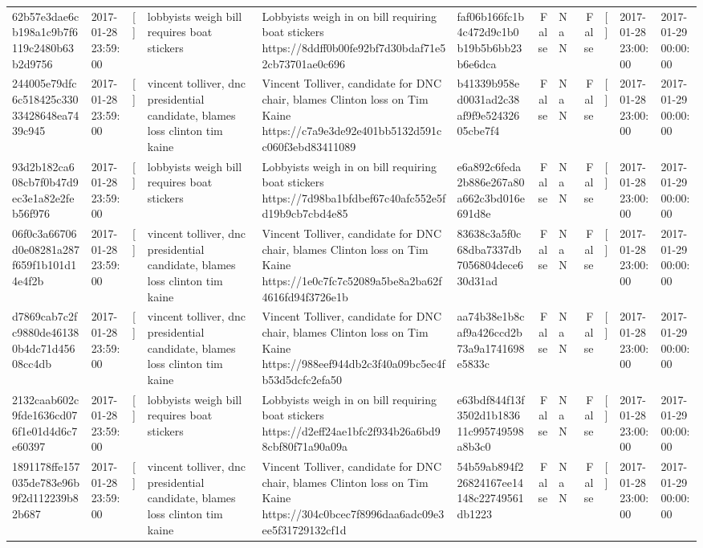 \begin{tabular}{llllllrlrlll}
62b57e3dae6cb198a1c9b7f6119c2480b63b2d9756 & 2017-01-28 23:59:00 & [] & lobbyists weigh bill requires boat stickers & Lobbyists weigh in on bill requiring boat stickers https://8ddff0b00fe92bf7d30bdaf71e52cb73701ae0c696 & faf06b166fc1b4c472d9c1b0b19b5b6bb23b6e6dca & False & NaN & False & [] & 2017-01-28 23:00:00 & 2017-01-29 00:00:00 \\
244005e79dfc6c518425c33033428648ea7439c945 & 2017-01-28 23:59:00 & [] & vincent tolliver, dnc presidential candidate, blames loss clinton tim kaine & Vincent Tolliver, candidate for DNC chair, blames Clinton loss on Tim Kaine https://c7a9e3de92e401bb5132d591cc060f3ebd83411089 & b41339b958ed0031ad2c38af9f9e52432605cbe7f4 & False & NaN & False & [] & 2017-01-28 23:00:00 & 2017-01-29 00:00:00 \\
93d2b182ca608cb7f0b47d9ec3e1a82e2feb56f976 & 2017-01-28 23:59:00 & [] & lobbyists weigh bill requires boat stickers & Lobbyists weigh in on bill requiring boat stickers https://7d98ba1bfdbef67c40afc552e5fd19b9cb7cbd4e85 & e6a892c6feda2b886e267a80a662c3bd016e691d8e & False & NaN & False & [] & 2017-01-28 23:00:00 & 2017-01-29 00:00:00 \\
06f0c3a66706d0e08281a287f659f1b101d14e4f2b & 2017-01-28 23:59:00 & [] & vincent tolliver, dnc presidential candidate, blames loss clinton tim kaine & Vincent Tolliver, candidate for DNC chair, blames Clinton loss on Tim Kaine https://1e0c7fc7c52089a5be8a2ba62f4616fd94f3726e1b & 83638c3a5f0c68dba7337db7056804dece630d31ad & False & NaN & False & [] & 2017-01-28 23:00:00 & 2017-01-29 00:00:00 \\
d7869cab7c2fc9880de461380b4dc71d45608cc4db & 2017-01-28 23:59:00 & [] & vincent tolliver, dnc presidential candidate, blames loss clinton tim kaine & Vincent Tolliver, candidate for DNC chair, blames Clinton loss on Tim Kaine https://988eef944db2c3f40a09bc5ec4fb53d5dcfc2efa50 & aa74b38e1b8caf9a426ccd2b73a9a1741698e5833c & False & NaN & False & [] & 2017-01-28 23:00:00 & 2017-01-29 00:00:00 \\
2132caab602c9fde1636cd076f1e01d4d6c7e60397 & 2017-01-28 23:59:00 & [] & lobbyists weigh bill requires boat stickers & Lobbyists weigh in on bill requiring boat stickers https://d2eff24ae1bfc2f934b26a6bd98cbf80f71a90a09a & e63bdf844f13f3502d1b183611c995749598a8b3c0 & False & NaN & False & [] & 2017-01-28 23:00:00 & 2017-01-29 00:00:00 \\
1891178ffe157035de783e96b9f2d112239b82b687 & 2017-01-28 23:59:00 & [] & vincent tolliver, dnc presidential candidate, blames loss clinton tim kaine & Vincent Tolliver, candidate for DNC chair, blames Clinton loss on Tim Kaine https://304c0bcec7f8996daa6adc09e3ee5f31729132cf1d & 54b59ab894f226824167ee14148c22749561db1223 & False & NaN & False & [] & 2017-01-28 23:00:00 & 2017-01-29 00:00:00 \\

\end{tabular}
